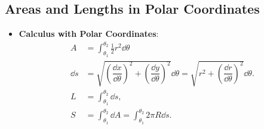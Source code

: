 \newpage

\subsection{Areas and Lengths in Polar Coordinates}  
\begin{center}
\begin{tcolorbox}
    \begin{itemize}
        \item \textbf{Calculus with Polar Coordinates}:
        \begin{align*}
        A &= \int_{\theta_1}^{\theta_2} \frac{1}{2}r^2 \dd \theta \tag{area enclosed by $r=f(\theta)$}\\
        \dd s &=  \sqrt{\left(\dfrac{\dd x}{\dd \theta}\right)^2 + \left(\dfrac{\dd y}{\dd \theta}\right)^2} \dd \theta = \sqrt{r^2 + \left(\dfrac{\dd r}{\dd \theta}\right)^2} \dd \theta. \\
        L &= \int_{\theta_1}^{\theta_2} \dd s,\\
        S &= \int_{\theta_1}^{\theta_2} \dd A = \int_{\theta_1}^{\theta_2} 2\pi R \dd s.\tag{surface area of revolution of a polar curve}
    \end{align*}
    \end{itemize}
\end{tcolorbox}
\end{center}


